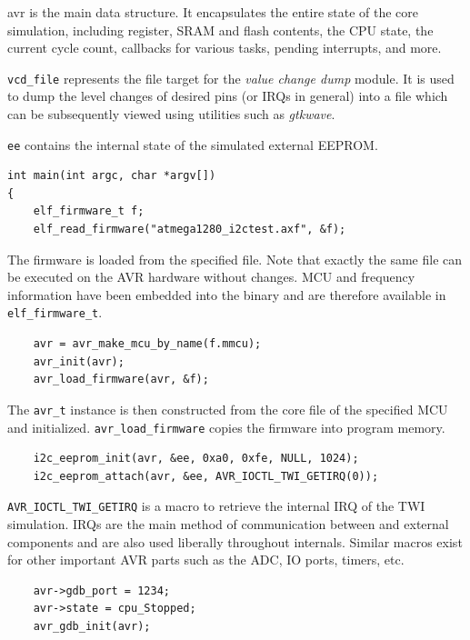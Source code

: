 avr is the main data structure. It encapsulates the entire state of the
core simulation, including register, \ac{SRAM} and flash contents, the \ac{CPU} state, the
current cycle count, callbacks for various tasks, pending interrupts, and more.

\lstinline|vcd_file| represents the file target for the \emph{value change dump} module. It
is used to dump the level changes of desired pins (or \acp{IRQ} in general) into a
file which can be subsequently viewed using utilities such as \emph{gtkwave}.

\lstinline|ee| contains the internal state of the simulated external \ac{EEPROM}.

\begin{lstlisting}
int main(int argc, char *argv[])
{
    elf_firmware_t f;
    elf_read_firmware("atmega1280_i2ctest.axf", &f);
\end{lstlisting}

The firmware is loaded from the specified file. Note that exactly the same file
can be executed on the \ac{AVR} hardware without changes. \ac{MCU} and frequency
information have been embedded into the binary and are therefore available in
\lstinline|elf_firmware_t|.

\begin{lstlisting}
    avr = avr_make_mcu_by_name(f.mmcu);
    avr_init(avr);
    avr_load_firmware(avr, &f);
\end{lstlisting}

The \lstinline|avr_t| instance is then constructed from the core file of the
specified \ac{MCU} and initialized. \lstinline|avr_load_firmware| copies the
firmware into program memory.

\begin{lstlisting}
    i2c_eeprom_init(avr, &ee, 0xa0, 0xfe, NULL, 1024);
    i2c_eeprom_attach(avr, &ee, AVR_IOCTL_TWI_GETIRQ(0));
\end{lstlisting}

\lstinline|AVR_IOCTL_TWI_GETIRQ| is a macro to retrieve the internal \ac{IRQ} of the \ac{TWI}
simulation. \acp{IRQ} are the main method of communication between \simavr and
external components and are also used liberally throughout \simavr internals.
Similar macros exist for other important \ac{AVR} parts such as the \ac{ADC}, \ac{IO} ports,
timers, etc.

\begin{lstlisting}
    avr->gdb_port = 1234;
    avr->state = cpu_Stopped;
    avr_gdb_init(avr);
\end{lstlisting}

